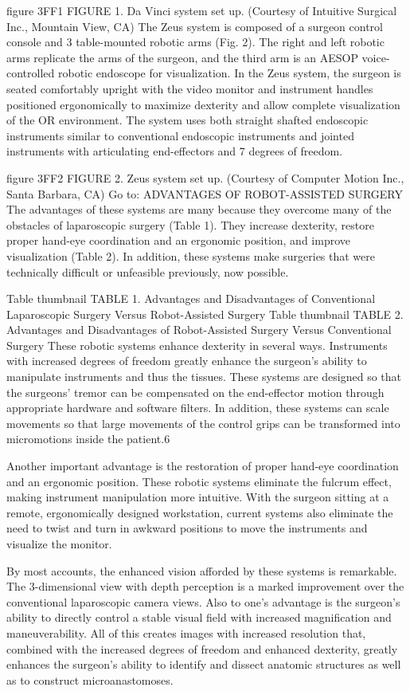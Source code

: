 figure 3FF1
FIGURE 1. Da Vinci system set up. (Courtesy of Intuitive Surgical Inc., Mountain View, CA)
The Zeus system is composed of a surgeon control console and 3 table-mounted robotic arms (Fig. 2). The right and left robotic arms replicate the arms of the surgeon, and the third arm is an AESOP voice-controlled robotic endoscope for visualization. In the Zeus system, the surgeon is seated comfortably upright with the video monitor and instrument handles positioned ergonomically to maximize dexterity and allow complete visualization of the OR environment. The system uses both straight shafted endoscopic instruments similar to conventional endoscopic instruments and jointed instruments with articulating end-effectors and 7 degrees of freedom.

figure 3FF2
FIGURE 2. Zeus system set up. (Courtesy of Computer Motion Inc., Santa Barbara, CA)
Go to:
ADVANTAGES OF ROBOT-ASSISTED SURGERY
The advantages of these systems are many because they overcome many of the obstacles of laparoscopic surgery (Table 1). They increase dexterity, restore proper hand-eye coordination and an ergonomic position, and improve visualization (Table 2). In addition, these systems make surgeries that were technically difficult or unfeasible previously, now possible.

Table thumbnail
TABLE 1. Advantages and Disadvantages of Conventional Laparoscopic Surgery Versus Robot-Assisted Surgery
Table thumbnail
TABLE 2. Advantages and Disadvantages of Robot-Assisted Surgery Versus Conventional Surgery
These robotic systems enhance dexterity in several ways. Instruments with increased degrees of freedom greatly enhance the surgeon’s ability to manipulate instruments and thus the tissues. These systems are designed so that the surgeons’ tremor can be compensated on the end-effector motion through appropriate hardware and software filters. In addition, these systems can scale movements so that large movements of the control grips can be transformed into micromotions inside the patient.6

Another important advantage is the restoration of proper hand-eye coordination and an ergonomic position. These robotic systems eliminate the fulcrum effect, making instrument manipulation more intuitive. With the surgeon sitting at a remote, ergonomically designed workstation, current systems also eliminate the need to twist and turn in awkward positions to move the instruments and visualize the monitor.

By most accounts, the enhanced vision afforded by these systems is remarkable. The 3-dimensional view with depth perception is a marked improvement over the conventional laparoscopic camera views. Also to one’s advantage is the surgeon’s ability to directly control a stable visual field with increased magnification and maneuverability. All of this creates images with increased resolution that, combined with the increased degrees of freedom and enhanced dexterity, greatly enhances the surgeon’s ability to identify and dissect anatomic structures as well as to construct microanastomoses.

